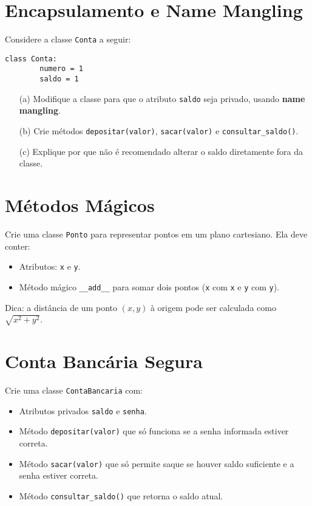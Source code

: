 \section{Encapsulamento e Name Mangling}
Considere a classe \texttt{Conta} a seguir:

\begin{verbatim}
class Conta:
        numero = 1
        saldo = 1
\end{verbatim}

\begin{itemize}
    \item[(a)] Modifique a classe para que o atributo \texttt{saldo} seja privado, usando \textbf{name mangling}.
    \item[(b)] Crie métodos \texttt{depositar(valor)}, \texttt{sacar(valor)} e \texttt{consultar\_saldo()}.
    \item[(c)] Explique por que não é recomendado alterar o saldo diretamente fora da classe.
\end{itemize}

\section{Métodos Mágicos}
Crie uma classe \texttt{Ponto} para representar pontos em um plano cartesiano.  
Ela deve conter:
\begin{itemize}
    \item Atributos: \texttt{x} e \texttt{y}.
    \item Método mágico \texttt{\_\_add\_\_} para somar dois pontos (\texttt{x} com \texttt{x} e \texttt{y} com \texttt{y}).
    
\end{itemize}

Dica: a distância de um ponto $(x, y)$ à origem pode ser calculada como $\sqrt{x^2 + y^2}$.




\section{Conta Bancária Segura}
Crie uma classe \texttt{ContaBancaria} com:
\begin{itemize}
    \item Atributos privados \texttt{saldo} e \texttt{senha}.
    \item Método \texttt{depositar(valor)} que só funciona se a senha informada estiver correta.
    \item Método \texttt{sacar(valor)} que só permite saque se houver saldo suficiente e a senha estiver correta.
    \item Método \texttt{consultar\_saldo()} que retorna o saldo atual.
\end{itemize}

